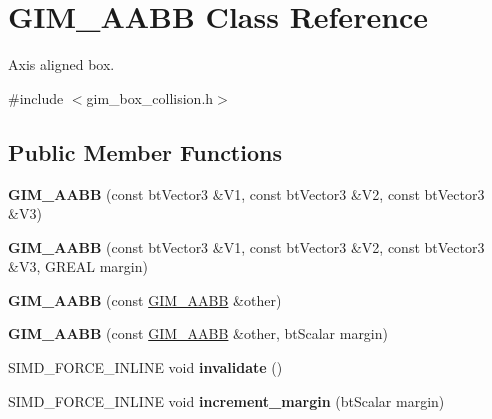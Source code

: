 \hypertarget{classGIM__AABB}{}\section{G\+I\+M\+\_\+\+A\+A\+BB Class Reference}
\label{classGIM__AABB}


Axis aligned box.  




{\ttfamily \#include $<$gim\+\_\+box\+\_\+collision.\+h$>$}

\subsection*{Public Member Functions}
\begin{DoxyCompactItemize}
\item 
\mbox{\label{classGIM__AABB_a847be701fed53b0d63ec602bce7652b1}} 
{\bfseries G\+I\+M\+\_\+\+A\+A\+BB} (const bt\+Vector3 \&V1, const bt\+Vector3 \&V2, const bt\+Vector3 \&V3)
\item 
\mbox{\label{classGIM__AABB_a371702e73b914b087cb2d489b9c54746}} 
{\bfseries G\+I\+M\+\_\+\+A\+A\+BB} (const bt\+Vector3 \&V1, const bt\+Vector3 \&V2, const bt\+Vector3 \&V3, G\+R\+E\+AL margin)
\item 
\mbox{\label{classGIM__AABB_ab28dc9e3419e00ba699ad8bea92d1cd8}} 
{\bfseries G\+I\+M\+\_\+\+A\+A\+BB} (const \hyperlink{classGIM__AABB}{G\+I\+M\+\_\+\+A\+A\+BB} \&other)
\item 
\mbox{\label{classGIM__AABB_aa938433d929ff7d8d462d6288f2b6964}} 
{\bfseries G\+I\+M\+\_\+\+A\+A\+BB} (const \hyperlink{classGIM__AABB}{G\+I\+M\+\_\+\+A\+A\+BB} \&other, bt\+Scalar margin)
\item 
\mbox{\label{classGIM__AABB_ac22819a9a73fab28f38d365c580e13b9}} 
S\+I\+M\+D\+\_\+\+F\+O\+R\+C\+E\+\_\+\+I\+N\+L\+I\+NE void {\bfseries invalidate} ()
\item 
\mbox{\label{classGIM__AABB_a803c42d8da1d2bdb73bc5338ae155bc6}} 
S\+I\+M\+D\+\_\+\+F\+O\+R\+C\+E\+\_\+\+I\+N\+L\+I\+NE void {\bfseries increment\+\_\+margin} (bt\+Scalar margin)
\item 
\mbox{\label{classGIM__AABB_a216e7f2c10a5cf26db9f2da43cfc91d6}} 

\end{DoxyCompactItemize}
